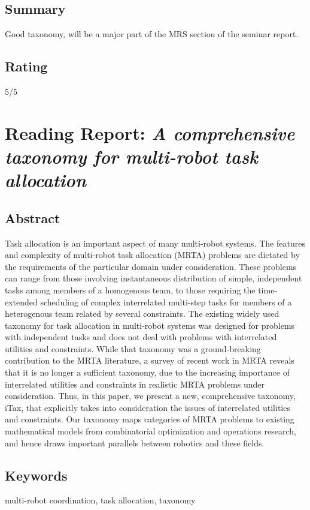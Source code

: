     \subsection*{Summary}
    Good taxonomy, will be a major part of the MRS section of the seminar report.
    \subsection*{Rating}
    5/5
    
    \newpage

    \section{Reading Report: \emph{A comprehensive taxonomy for multi-robot task allocation}}
    \cite{Korsah2013}
    
    \subsection*{Abstract}
    Task allocation is an important aspect of many multi-robot systems. The features and complexity of multi-robot task allocation (MRTA) problems are dictated by the requirements of the particular domain under consideration. These problems
    can range from those involving instantaneous distribution of simple, independent tasks among members of a homogenous
    team, to those requiring the time-extended scheduling of complex interrelated multi-step tasks for members of a heterogenous team related by several constraints. The existing widely used taxonomy for task allocation in multi-robot systems was
    designed for problems with independent tasks and does not deal with problems with interrelated utilities and constraints.
    While that taxonomy was a ground-breaking contribution to the MRTA literature, a survey of recent work in MRTA reveals
    that it is no longer a sufficient taxonomy, due to the increasing importance of interrelated utilities and constraints in
    realistic MRTA problems under consideration. Thus, in this paper, we present a new, comprehensive taxonomy, iTax, that
    explicitly takes into consideration the issues of interrelated utilities and constraints. Our taxonomy maps categories of
    MRTA problems to existing mathematical models from combinatorial optimization and operations research, and hence
    draws important parallels between robotics and these fields.
    
    \subsection*{Keywords}
    multi-robot coordination, task allocation, taxonomy
    
